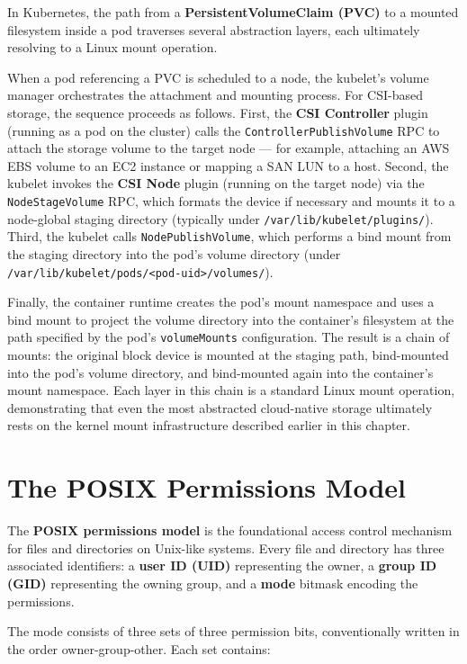 In Kubernetes, the path from a \textbf{PersistentVolumeClaim (PVC)} to a mounted filesystem inside a pod traverses several abstraction layers, each ultimately resolving to a Linux mount operation.

When a pod referencing a PVC is scheduled to a node, the kubelet's volume manager orchestrates the attachment and mounting process. For CSI-based storage, the sequence proceeds as follows. First, the \textbf{CSI Controller} plugin (running as a pod on the cluster) calls the \texttt{ControllerPublishVolume} RPC to attach the storage volume to the target node --- for example, attaching an AWS EBS volume to an EC2 instance or mapping a SAN LUN to a host. Second, the kubelet invokes the \textbf{CSI Node} plugin (running on the target node) via the \texttt{NodeStageVolume} RPC, which formats the device if necessary and mounts it to a node-global staging directory (typically under \texttt{/var/lib/kubelet/plugins/}). Third, the kubelet calls \texttt{NodePublishVolume}, which performs a bind mount from the staging directory into the pod's volume directory (under \texttt{/var/lib/kubelet/pods/<pod-uid>/volumes/}).

Finally, the container runtime creates the pod's mount namespace and uses a bind mount to project the volume directory into the container's filesystem at the path specified by the pod's \texttt{volumeMounts} configuration. The result is a chain of mounts: the original block device is mounted at the staging path, bind-mounted into the pod's volume directory, and bind-mounted again into the container's mount namespace. Each layer in this chain is a standard Linux mount operation, demonstrating that even the most abstracted cloud-native storage ultimately rests on the kernel mount infrastructure described earlier in this chapter.

\section{The POSIX Permissions Model}

The \textbf{POSIX permissions model} is the foundational access control mechanism for files and directories on Unix-like systems. Every file and directory has three associated identifiers: a \textbf{user ID (UID)} representing the owner, a \textbf{group ID (GID)} representing the owning group, and a \textbf{mode} bitmask encoding the permissions.

The mode consists of three sets of three permission bits, conventionally written in the order owner-group-other. Each set contains:


